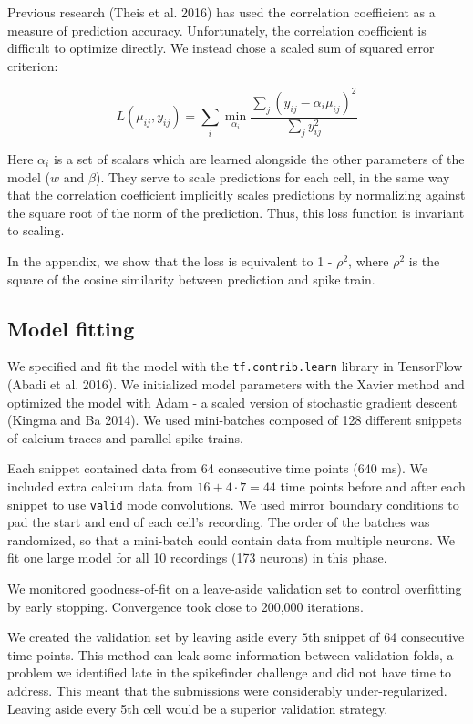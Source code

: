 \documentclass[]{article}
\begin{document}
Previous research (Theis et al. 2016) has used the correlation
coefficient as a measure of prediction accuracy. Unfortunately, the
correlation coefficient is difficult to optimize directly. We instead
chose a scaled sum of squared error criterion:

\[
L(\mu_{ij}, y_{ij}) = \sum_i \min_{\alpha_i} \frac{\sum_j (y_{ij} - \alpha_i \mu_{ij})^2}{\sum_{j} y_{ij}^2}
\]

Here \(\alpha_i\) is a set of scalars which are learned alongside the
other parameters of the model (\(w\) and \(\beta\)). They serve to scale
predictions for each cell, in the same way that the correlation
coefficient implicitly scales predictions by normalizing against the
square root of the norm of the prediction. Thus, this loss function is
invariant to scaling.

In the appendix, we show that the loss is equivalent to 1 - \(\rho^2\),
where \(\rho^2\) is the square of the cosine similarity between
prediction and spike train.

\subsection{Model fitting}\label{model-fitting}

We specified and fit the model with the \texttt{tf.contrib.learn}
library in TensorFlow (Abadi et al. 2016). We initialized model
parameters with the Xavier method and optimized the model with Adam - a
scaled version of stochastic gradient descent (Kingma and Ba 2014). We
used mini-batches composed of 128 different snippets of calcium traces
and parallel spike trains.

Each snippet contained data from 64 consecutive time points (640 ms). We
included extra calcium data from \(16 + 4 \cdot 7= 44\) time points
before and after each snippet to use \texttt{valid} mode convolutions.
We used mirror boundary conditions to pad the start and end of each
cell's recording. The order of the batches was randomized, so that a
mini-batch could contain data from multiple neurons. We fit one large
model for all 10 recordings (173 neurons) in this phase.

We monitored goodness-of-fit on a leave-aside validation set to control
overfitting by early stopping. Convergence took close to 200,000
iterations.

We created the validation set by leaving aside every \(5\)th snippet of
64 consecutive time points. This method can leak some information
between validation folds, a problem we identified late in the
spikefinder challenge and did not have time to address. This meant that
the submissions were considerably under-regularized. Leaving aside every
5th cell would be a superior validation strategy.
\end{document}
